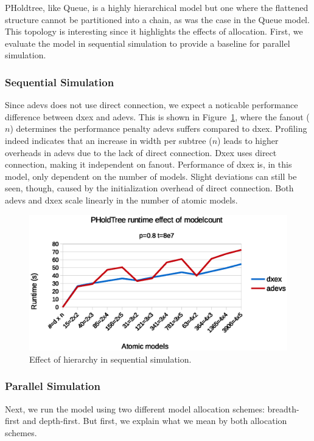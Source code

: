PHoldtree, like Queue, is a highly hierarchical model but one where the flattened structure cannot be partitioned into a chain, as was the case in the Queue model.
This topology is interesting since it highlights the effects of allocation.
First, we evaluate the model in sequential simulation to provide a baseline for parallel simulation.

\subsubsection{Sequential Simulation}
Since adevs does not use direct connection, we expect a noticable performance difference between dxex and adevs.
This is shown in Figure~\ref{fig:PHOLDtree_seq_dn_benchmark}, where the fanout ($n$) determines the performance penalty adevs suffers compared to dxex.
Profiling indeed indicates that an increase in width per subtree ($n$) leads to higher overheads in adevs due to the lack of direct connection.
Dxex uses direct connection, making it independent on fanout.
Performance of dxex is, in this model, only dependent on the number of models.
Slight deviations can still be seen, though, caused by the initialization overhead of direct connection.
Both adevs and dxex scale linearly in the number of atomic models.

\begin{figure}
    \center
    \includegraphics[width=\columnwidth]{fig/pholdtree_sequential_dn.eps}
    \caption{Effect of hierarchy in sequential simulation.}
    \label{fig:PHOLDtree_seq_dn_benchmark}
\end{figure}

\subsubsection{Parallel Simulation}
Next, we run the model using two different model allocation schemes: breadth-first and depth-first.
But first, we explain what we mean by both allocation schemes.

